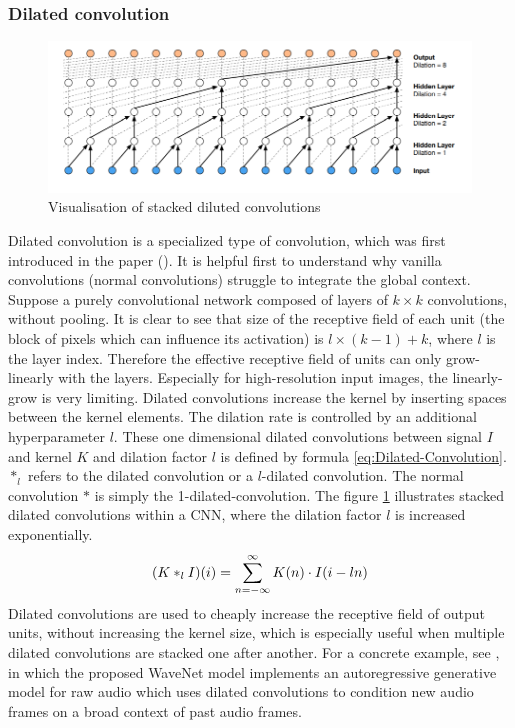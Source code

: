 \subsubsection{Dilated convolution}
\label{subsub:Dilated-Convolution}
\begin{figure}[htbp]
	\centering
	\includegraphics[scale=0.9]{img/Dilated_Colvolution.png}
	\caption[SINS database recording environment map]{Visualisation of stacked diluted convolutions\footnotemark}
	\label{fig:Dilated-Convolution}
\end{figure}
\noindent
Dilated convolution is a specialized type of convolution, which was first introduced in the paper (\cite{yu_multi-scale_2016}). It is helpful first to understand why vanilla convolutions (normal convolutions) struggle to integrate the global context. Suppose a purely convolutional network composed of layers of $k \times k$ convolutions, without pooling. It is clear to see that size of the receptive field of each unit (the block of pixels which can influence its activation) is $l \times (k-1) + k$, where $l$ is the layer index. Therefore the effective receptive field of units can only grow-linearly with the layers. Especially for high-resolution input images, the linearly-grow is very limiting.
\newline
\newline
Dilated convolutions increase the kernel by inserting spaces between the kernel elements. The dilation rate is controlled by an additional hyperparameter $l$. These one dimensional dilated convolutions between signal $I$ and kernel $K$ and dilation factor $l$ is defined by formula \ref{eq:Dilated-Convolution}. $\ast_l$ refers to the dilated convolution or a $l$-dilated convolution. The normal convolution $\ast$ is simply the 1-dilated-convolution. The figure \ref{fig:Dilated-Convolution} illustrates stacked dilated convolutions within a \gls{CNN}, where the dilation factor $l$ is increased exponentially.
\begin{equation}
    \centering
    (K \ast_l I)(i) = \sum_{n=-\infty}^\infty K(n) \cdot I(i - ln)
    \label{eq:Dilated-Convolution}
\end{equation}
Dilated convolutions are used to cheaply increase the receptive field of output units, without increasing the kernel size, which is especially useful when multiple dilated convolutions are stacked one after another. For a concrete example, see \cite{oord_wavenet_2016}, in which the proposed WaveNet model implements an autoregressive generative model for raw audio which uses dilated convolutions to condition new audio frames on a broad context of past audio frames.

